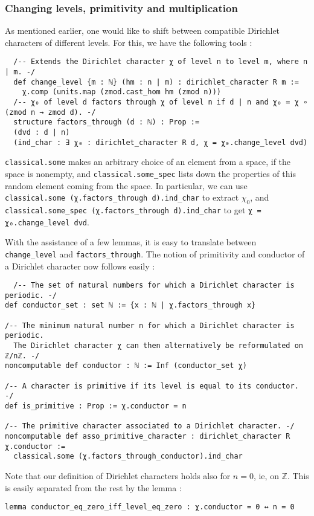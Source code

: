 \documentclass[11pt]{article}
\newcommand{\lean}[1]{\texttt{#1}\xspace} %
\begin{document}
\subsubsection{Changing levels, primitivity and multiplication}
As mentioned earlier, one would like to shift between compatible Dirichlet characters of different levels. For this, we have the following tools : 
\begin{lstlisting}
  /-- Extends the Dirichlet character χ of level n to level m, where n | m. -/
  def change_level {m : ℕ} (hm : n | m) : dirichlet_character R m :=
    χ.comp (units.map (zmod.cast_hom hm (zmod n)))
  /-- χ₀ of level d factors through χ of level n if d | n and χ₀ = χ ∘ (zmod n → zmod d). -/
  structure factors_through (d : ℕ) : Prop :=
  (dvd : d | n)
  (ind_char : ∃ χ₀ : dirichlet_character R d, χ = χ₀.change_level dvd)
\end{lstlisting}

\lean{classical.some} makes an arbitrary choice of an element from a space, if the space
is nonempty, and \lean{classical.some\_spec} lists down the properties of this random element
coming from the space. In particular, we can use \lean{classical.some (χ.factors\_through d).ind\_char} 
to extract $\chi_0$, and \lean{classical.some\_spec (χ.factors\_through d).ind\_char} to get 
\lean{χ = χ₀.change\_level dvd}.

With the assistance of a few lemmas, it is easy to translate between \lean{change\_level} and \lean{factors\_through}. The notion of primitivity 
and conductor of a Dirichlet character now follows easily : 
\begin{lstlisting}
  /-- The set of natural numbers for which a Dirichlet character is periodic. -/
def conductor_set : set ℕ := {x : ℕ | χ.factors_through x}

/-- The minimum natural number n for which a Dirichlet character is periodic.
  The Dirichlet character χ can then alternatively be reformulated on ℤ/nℤ. -/
noncomputable def conductor : ℕ := Inf (conductor_set χ)

/-- A character is primitive if its level is equal to its conductor. -/
def is_primitive : Prop := χ.conductor = n

/-- The primitive character associated to a Dirichlet character. -/
noncomputable def asso_primitive_character : dirichlet_character R χ.conductor :=
  classical.some (χ.factors_through_conductor).ind_char
\end{lstlisting}

Note that our definition of Dirichlet characters holds also for $n = 0$, ie, on $\mathbb{Z}$. 
This is easily separated from the rest by the lemma : 
\begin{lstlisting}
lemma conductor_eq_zero_iff_level_eq_zero : χ.conductor = 0 ↔ n = 0
\end{lstlisting}
\end{document}
